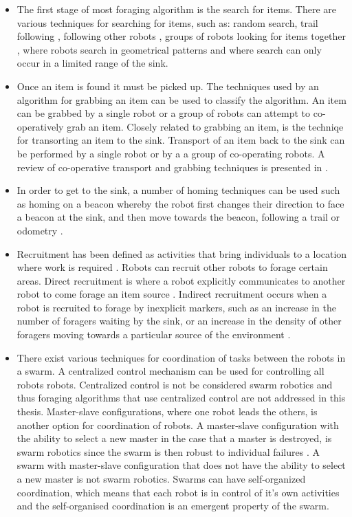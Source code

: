 \begin{itemize}
\item The first stage of most foraging algorithm is the search for items. There are various techniques for searching for items, such as: random search, trail following \cite{schmickl2006trophallaxis}, following other robots \cite{dorigo2013swarmanoid, werger1996robotic}, groups of robots looking for items together \cite{vincent2004framework}, where robots search in geometrical patterns and where search can only occur in a limited range of the sink.

\item Once an item is found it must be picked up. The techniques used by an algorithm for grabbing an item can be used to classify the algorithm. An item can be grabbed by a single robot or a group of robots can attempt to co-operatively grab an item. Closely related to grabbing an item, is the techniqe for transorting an item to the sink. Transport of an item back to the sink can be performed by a single robot or by a a group of co-operating robots. A review of co-operative transport and grabbing techniques is presented in \cite{kube2000cooperative}.

\item In order to get to the sink, a number of homing techniques can be used such as homing on a beacon whereby the robot first changes their direction to face a beacon at the sink, and then move towards the beacon, following a trail or odometry \cite{winfield2009towards}.

\item Recruitment has been defined as activities that bring individuals to a location where work is required \cite{holldobler1990ants}. Robots can recruit other robots to forage certain areas. Direct recruitment is where a robot explicitly communicates to another robot to come forage an item source \cite{krieger2000ant,labella2006division}. Indirect recruitment occurs when a robot is recruited to forage by inexplicit markers, such as an increase in the number of foragers waiting by the sink, or an increase in the density of other foragers moving towards a particular source of the environment \cite{arkin1992cooperation}. 

\item There exist various techniques for coordination of tasks between the robots in a swarm. A centralized control mechanism can be used for controlling all robots robots. Centralized control is not be considered swarm robotics and thus foraging algorithms that use centralized control are not addressed in this thesis. Master-slave configurations, where one robot leads the others, is another option for coordination of robots. A master-slave configuration with the ability to select a new master in the case that a master is destroyed, is swarm robotics since the swarm is then robust to individual failures \cite{karpov2015leader, hoeing2007auction}. A swarm with master-slave configuration that does not have the ability to select a new master is not swarm robotics. Swarms can have self-organized coordination, which means that each robot is in control of it's own activities and the self-organised coordination is an emergent property of the swarm. %
\end{itemize}

